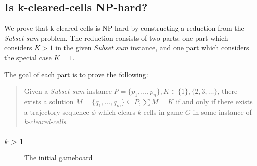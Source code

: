 \subsection{Is k-cleared-cells NP-hard?}

We prove that k-cleared-cells is NP-hard by constructing a reduction from the \textit{Subset sum} problem. The reduction consists of two parts: one part which considers $K > 1$ in the given \textit{Subset sum} instance, and one part which considers the special case $K = 1$.

The goal of each part is to prove the following: 

\begin{quote}
Given a \textit{Subset sum} instance $P = \{p_1, \ldots, p_n\}, K \in \{1\} ,\{2, 3, \ldots \}$, there exists a solution $M = \{q_1, \ldots, q_m \} \subseteq P, \sum M = K$ if and only if there exists a trajectory sequence $\phi$ which clears $k$ cells in game $G$ in some instance of \textit{k-cleared-cells}.
\end{quote}

\subsubsection{$k > 1$}

\begin{figure}[H]
    \centering
    \caption{The initial gameboard}
    \label{fig:initial}
\end{figure}
